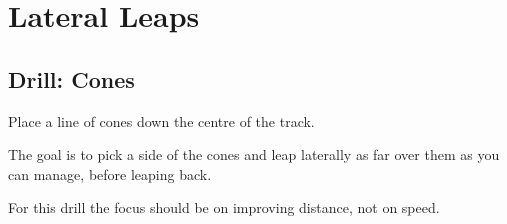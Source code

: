 \section*{Lateral Leaps}
\label{sec:juke/lateral_leaps}


\subsection*{Drill: Cones} 
Place a line of cones down the centre of the track.

The goal is to pick a side of the cones and leap laterally as far over them as you can manage, before leaping back.    

For this drill the focus should be on improving distance, not on speed.
